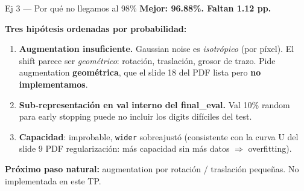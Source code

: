 \documentclass[11pt,aspectratio=169]{beamer}
\newcommand{\code}[1]{\texttt{\textcolor{accent}{#1}}}
\begin{document}
\begin{frame}{Ej 3 — Por qué no llegamos al 98\%}
\centering
\Large \textcolor{warn}{\textbf{Mejor: 96.88\%. Faltan 1.12 pp.}}\\[0.6em]

\normalsize\raggedright
\textbf{Tres hipótesis ordenadas por probabilidad:}
\begin{enumerate}\setlength\itemsep{0.2em}
  \item \textbf{Augmentation insuficiente.} Gaussian noise es \emph{isotrópico} (por píxel). El shift parece ser \emph{geométrico}: rotación, traslación, grosor de trazo. Pide augmentation \textbf{geométrica}, que el slide 18 del PDF lista pero \textbf{no implementamos}.
  \item \textbf{Sub-representación en val interno del final\_eval.} Val 10\% random para early stopping puede no incluir los digits difíciles del test.
  \item \textbf{Capacidad}: improbable, \code{wider} sobreajustó (consistente con la curva U del slide 9 PDF regularización: más capacidad sin más datos $\Rightarrow$ overfitting).
\end{enumerate}
\vspace{0.4em}

\begin{takeaway}
\textbf{Próximo paso natural:} augmentation por rotación / traslación pequeñas. No implementada en este TP.
\end{takeaway}
\end{frame}
\end{document}
